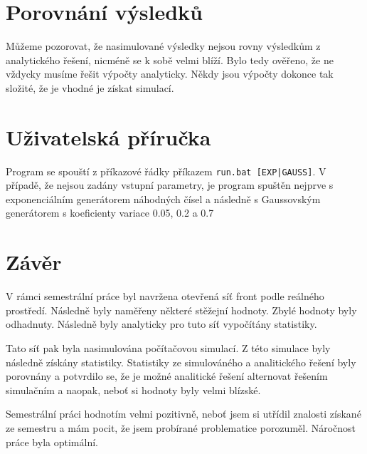 \documentclass{article}
\begin{document}
\section{Porovnání výsledků}

Můžeme pozorovat, že nasimulované výsledky nejsou rovny výsledkům z analytického řešení, nicméně se k sobě velmi blíží. 
Bylo tedy ověřeno, že ne vždycky musíme řešit výpočty analyticky. 
Někdy jsou výpočty dokonce tak složité, že je vhodné je získat simulací.

\section{Uživatelská příručka}

Program se spouští z příkazové řádky příkazem \texttt{run.bat [EXP|GAUSS]}. 
V případě, že nejsou zadány vstupní parametry, je program spuštěn nejprve s exponenciálním generátorem náhodných čísel a následně s Gaussovským generátorem s koeficienty variace 0.05, 0.2  a 0.7


\section{Závěr} %

V rámci semestrální práce byl navržena otevřená síť front podle reálného prostředí. 
Následně byly naměřeny některé stěžejní hodnoty. 
Zbylé hodnoty byly odhadnuty. Následně byly analyticky pro tuto síť vypočítány statistiky. 

Tato síť pak byla nasimulována počítačovou simulací. 
Z této simulace byly následně získány statistiky.
Statistiky ze simulováného a analitického řešení byly porovnány a potvrdilo se, že je možné analitické řešení alternovat řešením simulačním a naopak, neboť si hodnoty byly velmi blízské.

Semestrální práci hodnotím velmi pozitivně, neboť jsem si utřídil znalosti získané ze semestru a mám pocit, že jsem probírané problematice porozuměl. Náročnost práce byla optimální.

  
\end{document}
